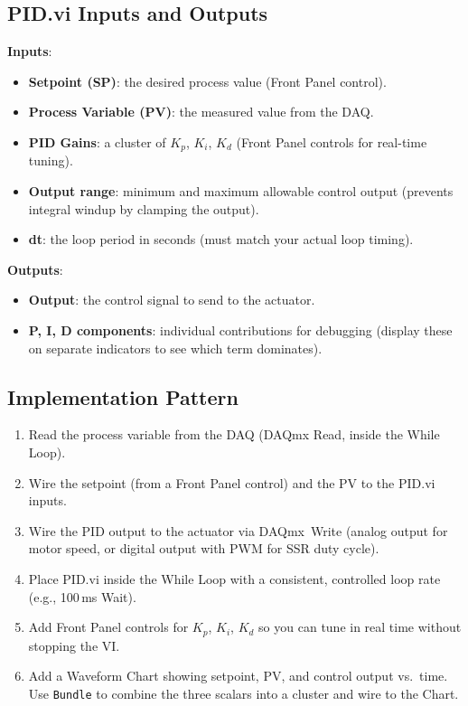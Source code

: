 \subsection{PID.vi Inputs and Outputs}

\textbf{Inputs}:
\begin{itemize}[nosep,leftmargin=1.5em]
\item \textbf{Setpoint (SP)}: the desired process value (Front Panel control).
\item \textbf{Process Variable (PV)}: the measured value from the DAQ.
\item \textbf{PID Gains}: a cluster of $K_p$, $K_i$, $K_d$ (Front Panel controls for real-time tuning).
\item \textbf{Output range}: minimum and maximum allowable control output (prevents integral windup by clamping the output).
\item \textbf{dt}: the loop period in seconds (must match your actual loop timing).
\end{itemize}

\textbf{Outputs}:
\begin{itemize}[nosep,leftmargin=1.5em]
\item \textbf{Output}: the control signal to send to the actuator.
\item \textbf{P, I, D components}: individual contributions for debugging (display these on separate indicators to see which term dominates).
\end{itemize}

\subsection{Implementation Pattern}

\begin{enumerate}[leftmargin=1.5em]
\item Read the process variable from the DAQ (DAQmx Read, inside the While Loop).
\item Wire the setpoint (from a Front Panel control) and the PV to the PID.vi inputs.
\item Wire the PID output to the actuator via DAQmx~Write (analog output for motor speed, or digital output with PWM for SSR duty cycle).
\item Place PID.vi inside the While Loop with a consistent, controlled loop rate (e.g., 100\,ms Wait).
\item Add Front Panel controls for $K_p$, $K_i$, $K_d$ so you can tune in real time without stopping the VI.
\item Add a Waveform Chart showing setpoint, PV, and control output vs.\ time. Use \texttt{Bundle} to combine the three scalars into a cluster and wire to the Chart.
\end{enumerate}

